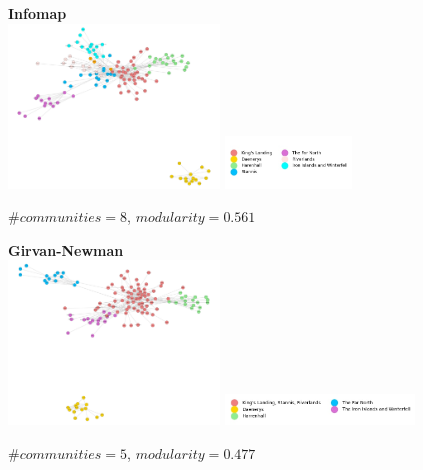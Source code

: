 \documentclass[10pt,twocolumn,letterpaper]{article}
\begin{document}
\newpage

\begin{figure}[!h]
    \centering
    \textbf{Infomap}  \\
    \includegraphics[width=0.5\textwidth]{img/s2/communities_infomap.jpg}
    \includegraphics[width=0.3\textwidth]{img/s2/infomap_legend.jpg}\\
    \caption{\small{$\#communities=8$, $modularity=0.561$}}
    \label{fig:infomap_s2}
\end{figure}


\begin{figure}[!h]
    \centering
    \textbf{Girvan-Newman} \\
    \includegraphics[width=0.5\textwidth]{img/s2/communities_g-n.jpg}
    \includegraphics[width=0.45\textwidth]{img/s2/g-n_legend.jpg}\\
    \caption{\small{$\#communities=5$, $modularity=0.477$}}
    \label{fig:gn_s2}
\end{figure}

\vspace{5cm}
\end{document}
